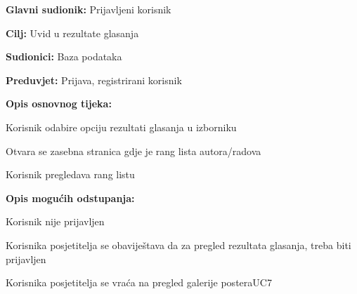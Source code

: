 					\noindent {}
					\begin{packed_item}
						
						\item \textbf{Glavni sudionik: } Prijavljeni korisnik
						\item  \textbf{Cilj:} Uvid u rezultate glasanja
						\item  \textbf{Sudionici:} Baza podataka
						\item  \textbf{Preduvjet:} Prijava, registrirani korisnik
						\item  \textbf{Opis osnovnog tijeka:}
						
						\item[] \begin{packed_enum}
							
							\item Korisnik odabire opciju rezultati glasanja u izborniku
							\item Otvara se zasebna stranica gdje je rang lista autora/radova
							\item Korisnik pregledava rang listu
						\end{packed_enum}
						
						\item  \textbf{Opis mogućih odstupanja:}
						
						\item[] \begin{packed_item}
							
							\item[1.a] Korisnik nije prijavljen
							\item[] \begin{packed_enum}
								
								\item Korisnika posjetitelja se obaviještava da za pregled rezultata glasanja, treba biti prijavljen
								\item Korisnika posjetitelja se vraća na pregled galerije postera{UC7}
								
							\end{packed_enum}
							
						\end{packed_item}
					\end{packed_item}
					
